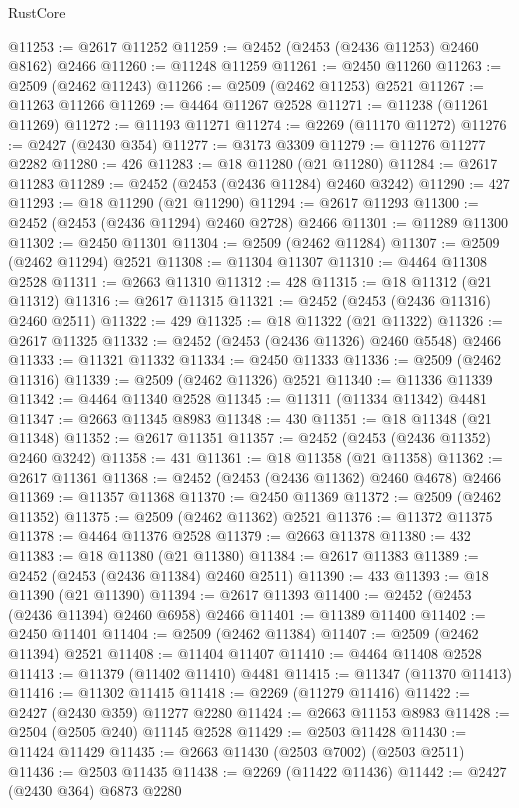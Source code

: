 \begin{lexlean}{RustCore}
\begin{coremodule}
@11253 := @2617 @11252
@11259 := @2452 (@2453 (@2436 @11253) @2460 @8162) @2466
@11260 := @11248 @11259
@11261 := @2450 @11260
@11263 := @2509 (@2462 @11243)
@11266 := @2509 (@2462 @11253) @2521
@11267 := @11263 @11266
@11269 := @4464 @11267 @2528
@11271 := @11238 (@11261 @11269)
@11272 := @11193 @11271
@11274 := @2269 (@11170 @11272)
@11276 := @2427 (@2430 @354)
@11277 := @3173 @3309
@11279 := @11276 @11277 @2282
@11280 := 426
@11283 := @18 @11280 (@21 @11280)
@11284 := @2617 @11283
@11289 := @2452 (@2453 (@2436 @11284) @2460 @3242)
@11290 := 427
@11293 := @18 @11290 (@21 @11290)
@11294 := @2617 @11293
@11300 := @2452 (@2453 (@2436 @11294) @2460 @2728) @2466
@11301 := @11289 @11300
@11302 := @2450 @11301
@11304 := @2509 (@2462 @11284)
@11307 := @2509 (@2462 @11294) @2521
@11308 := @11304 @11307
@11310 := @4464 @11308 @2528
@11311 := @2663 @11310
@11312 := 428
@11315 := @18 @11312 (@21 @11312)
@11316 := @2617 @11315
@11321 := @2452 (@2453 (@2436 @11316) @2460 @2511)
@11322 := 429
@11325 := @18 @11322 (@21 @11322)
@11326 := @2617 @11325
@11332 := @2452 (@2453 (@2436 @11326) @2460 @5548) @2466
@11333 := @11321 @11332
@11334 := @2450 @11333
@11336 := @2509 (@2462 @11316)
@11339 := @2509 (@2462 @11326) @2521
@11340 := @11336 @11339
@11342 := @4464 @11340 @2528
@11345 := @11311 (@11334 @11342) @4481
@11347 := @2663 @11345 @8983
@11348 := 430
@11351 := @18 @11348 (@21 @11348)
@11352 := @2617 @11351
@11357 := @2452 (@2453 (@2436 @11352) @2460 @3242)
@11358 := 431
@11361 := @18 @11358 (@21 @11358)
@11362 := @2617 @11361
@11368 := @2452 (@2453 (@2436 @11362) @2460 @4678) @2466
@11369 := @11357 @11368
@11370 := @2450 @11369
@11372 := @2509 (@2462 @11352)
@11375 := @2509 (@2462 @11362) @2521
@11376 := @11372 @11375
@11378 := @4464 @11376 @2528
@11379 := @2663 @11378
@11380 := 432
@11383 := @18 @11380 (@21 @11380)
@11384 := @2617 @11383
@11389 := @2452 (@2453 (@2436 @11384) @2460 @2511)
@11390 := 433
@11393 := @18 @11390 (@21 @11390)
@11394 := @2617 @11393
@11400 := @2452 (@2453 (@2436 @11394) @2460 @6958) @2466
@11401 := @11389 @11400
@11402 := @2450 @11401
@11404 := @2509 (@2462 @11384)
@11407 := @2509 (@2462 @11394) @2521
@11408 := @11404 @11407
@11410 := @4464 @11408 @2528
@11413 := @11379 (@11402 @11410) @4481
@11415 := @11347 (@11370 @11413)
@11416 := @11302 @11415
@11418 := @2269 (@11279 @11416)
@11422 := @2427 (@2430 @359) @11277 @2280
@11424 := @2663 @11153 @8983
@11428 := @2504 (@2505 @240) @11145 @2528
@11429 := @2503 @11428
@11430 := @11424 @11429
@11435 := @2663 @11430 (@2503 @7002) (@2503 @2511)
@11436 := @2503 @11435
@11438 := @2269 (@11422 @11436)
@11442 := @2427 (@2430 @364) @6873 @2280

\end{coremodule}
\end{lexlean}
